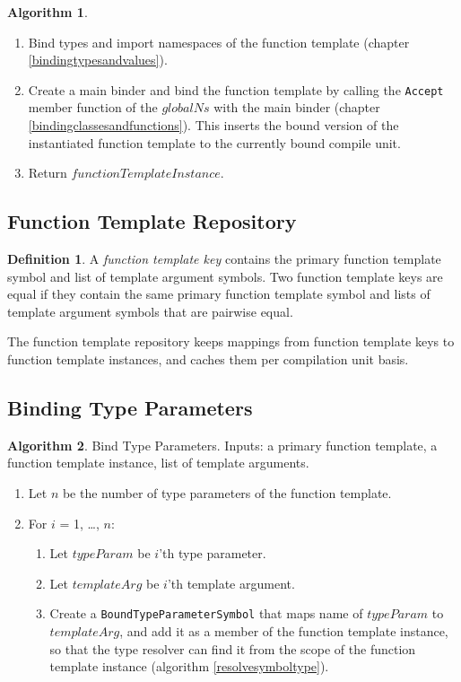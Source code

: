 \documentclass[a4paper,oneside,11pt]{book}
\theoremstyle{definition}
\newtheorem{algo}{Algorithm}[section]
\newtheorem{defn}{Definition}[section]
\begin{document}
\begin{algo}
\begin{enumerate}
\item
Bind types and import namespaces of the function template (chapter \ref{bindingtypesandvalues}).
\item
Create a main binder and bind the function template by calling the \verb|Accept| member function of the $globalNs$ with the main binder
(chapter \ref{bindingclassesandfunctions}). This inserts the bound version of the instantiated function template to the currently bound compile unit.
\item
Return $functionTemplateInstance$.
\end{enumerate}
\end{algo}

\subsection{Function Template Repository}

\begin{defn}\label{functiontemplatekey} A \emph{function template key} contains the primary function template symbol and list of template argument symbols.
Two function template keys are equal if they contain the same primary function template symbol and
lists of template argument symbols that are pairwise equal.
\end{defn}

The function template repository keeps mappings from function template keys to function template instances, and caches them per compilation unit basis.

\subsection{Binding Type Parameters}

\begin{algo}\label{bindtypeparams} Bind Type Parameters. Inputs: a primary function template, a function template instance, list of template arguments.
\begin{enumerate}
\item
Let $n$ be the number of type parameters of the function template.
\item
For $i$ = 1, \ldots, $n$:
\begin{enumerate}
\item
Let $typeParam$ be $i$'th type parameter.
\item
Let $templateArg$ be $i$'th template argument.
\item
Create a \verb|BoundTypeParameterSymbol| that maps name of $typeParam$ to $templateArg$, and add it as a member of the function template instance,
so that the type resolver can find it from the scope of the function template instance (algorithm \ref{resolvesymboltype}).
\end{enumerate}
\end{enumerate}
\end{algo}
\end{document}

